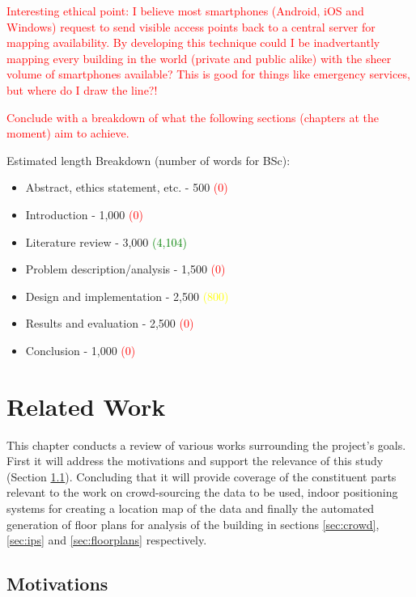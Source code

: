\documentclass{UoYCSproject}
\begin{document}
        \textcolor{red}{Interesting ethical point: I believe most smartphones (Android, iOS and Windows) request to send visible access points back to a central server for mapping availability. By developing this technique could I be inadvertantly mapping every building in the world (private and public alike) with the sheer volume of smartphones available? This is good for things like emergency services, but where do I draw the line?!}
        
        \textcolor{red}{Conclude with a breakdown of what the following sections (chapters at the moment) aim to achieve.}
        
        Estimated length Breakdown (number of words for BSc):
        \begin{itemize}
        	\item Abstract, ethics statement, etc. - 500 \textcolor{red}{(0)}
        	\item Introduction - 1,000 \textcolor{red}{(0)}
        	\item Literature review - 3,000 \textcolor{green}{(4,104)}
        	\item Problem description/analysis - 1,500 \textcolor{red}{(0)}
        	\item Design and implementation - 2,500 \textcolor{yellow}{(800)}
        	\item Results and evaluation - 2,500 \textcolor{red}{(0)}
        	\item Conclusion - 1,000 \textcolor{red}{(0)}
        \end{itemize}
	
	\chapter{Related Work}
    \label{chap:related}
	
		This chapter conducts a review of various works surrounding the project's goals. First it will address the motivations and support the relevance of this study (Section \ref{sec:motivations}). Concluding that it will provide coverage of the constituent parts relevant to the work on crowd-sourcing the data to be used, indoor positioning systems for creating a location map of the data and finally the automated generation of floor plans for analysis of the building in sections \ref{sec:crowd}, \ref{sec:ips} and \ref{sec:floorplans} respectively.
        
        \section{Motivations}
        \label{sec:motivations}
        
\end{document}
